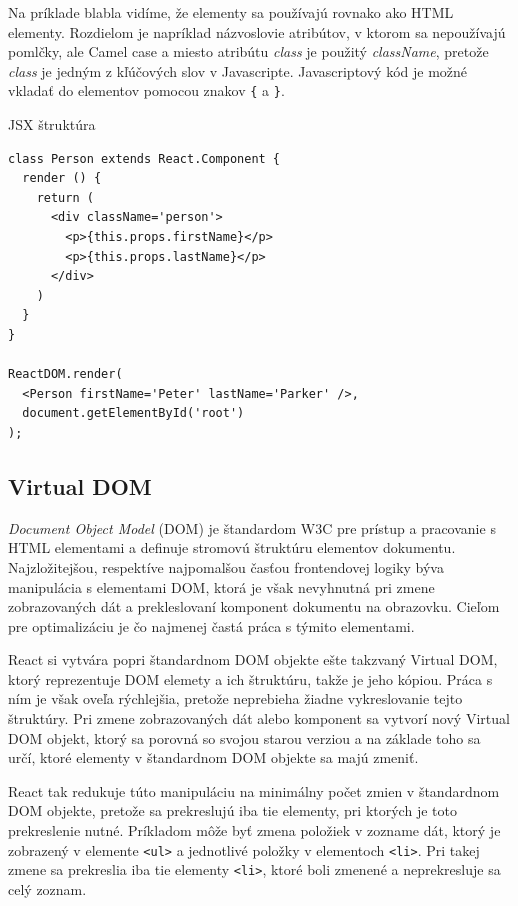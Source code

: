 \documentclass[
  digital, %
  table,   %
  lof,     %
  lot,     %
]{fithesis3}
\begin{document}
Na príklade blabla vidíme, že elementy sa používajú rovnako ako HTML elementy. Rozdielom je napríklad názvoslovie atribútov, v ktorom sa nepoužívajú pomlčky, ale Camel case a miesto atribútu \textit{class} je použitý \textit{className}, pretože \textit{class} je jedným z kľúčových slov v Javascripte. Javascriptový kód je možné vkladať do elementov pomocou znakov \texttt{\{} a \texttt{\}}.

\begin{exmp}
JSX štruktúra
\centering
\begin{lstlisting}[basicstyle=\small]
class Person extends React.Component {
  render () {
    return (
      <div className='person'>
        <p>{this.props.firstName}</p>
        <p>{this.props.lastName}</p>
      </div>
    )
  }
}

ReactDOM.render(
  <Person firstName='Peter' lastName='Parker' />,
  document.getElementById('root')
);
\end{lstlisting}
\end{exmp}

\subsection{Virtual DOM}
\textit{Document Object Model} (DOM) je štandardom W3C pre prístup a pracovanie s HTML elementami a definuje stromovú štruktúru elementov dokumentu. Najzložitejšou, respektíve najpomalšou časťou frontendovej logiky býva manipulácia s elementami DOM, ktorá je však nevyhnutná pri zmene zobrazovaných dát a prekleslovaní komponent dokumentu na obrazovku. Cieľom pre optimalizáciu je čo najmenej častá práca s týmito elementami.

React si vytvára popri štandardnom DOM objekte ešte takzvaný Virtual DOM, ktorý reprezentuje DOM elemety a ich štruktúru, takže je jeho kópiou. Práca s ním je však oveľa rýchlejšia, pretože neprebieha žiadne vykreslovanie tejto štruktúry. Pri zmene zobrazovaných dát alebo komponent sa vytvorí nový Virtual DOM objekt, ktorý sa porovná so svojou starou verziou a na základe toho sa určí, ktoré elementy v štandardnom DOM objekte sa majú zmeniť.

React tak redukuje túto manipuláciu na minimálny počet zmien v štandardnom DOM objekte, pretože sa prekreslujú iba tie elementy, pri ktorých je toto prekreslenie nutné. Príkladom môže byť zmena položiek v zozname dát, ktorý je zobrazený v elemente \texttt{<ul>} a jednotlivé položky v elementoch \texttt{<li>}. Pri takej zmene sa prekreslia iba tie elementy \texttt{<li>}, ktoré boli zmenené a neprekresluje sa celý zoznam.
\end{document}

